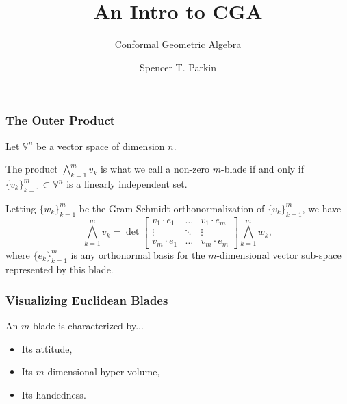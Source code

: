 \documentclass{beamer}
\title{An Intro to CGA}
\subtitle{Conformal Geometric Algebra}
\author{Spencer T. Parkin}
\institute{Avalanche Software}
\newcommand{\V}{\mathbb{V}}
\begin{document}
\frame{\titlepage}




\begin{frame}
\frametitle{The Outer Product}
Let $\V^n$ be a vector space of dimension $n$.
\pause
\begin{definition}
The product $\bigwedge_{k=1}^m v_k$ is what we call a non-zero $m$-blade if and only if
$\{v_k\}_{k=1}^m\subset\V^n$ is a linearly independent set.
\end{definition}
\pause
\begin{definition}
Letting $\{w_k\}_{k=1}^m$ be the Gram-Schmidt orthonormalization of $\{v_k\}_{k=1}^m$,
we have
\begin{equation*}
\bigwedge_{k=1}^m v_k = \det\left[
\begin{array}{ccc}
v_1\cdot e_1 & \dots & v_1\cdot e_m \\
\vdots & \ddots & \vdots \\
v_m\cdot e_1 & \dots & v_m\cdot e_m
\end{array}
\right]\bigwedge_{k=1}^m w_k,
\end{equation*}
where $\{e_k\}_{k=1}^m$ is any orthonormal basis for the $m$-dimensional
vector sub-space represented by this blade.
\end{definition}
\end{frame}

\begin{frame}
\frametitle{Visualizing Euclidean Blades}
An $m$-blade is characterized by...\pause
\begin{itemize}
\item Its \alert{attitude},\pause
\item Its $m$-dimensional \alert{hyper-volume},\pause
\item Its \alert{handedness}.
\end{itemize}
\end{frame}
\end{document}
